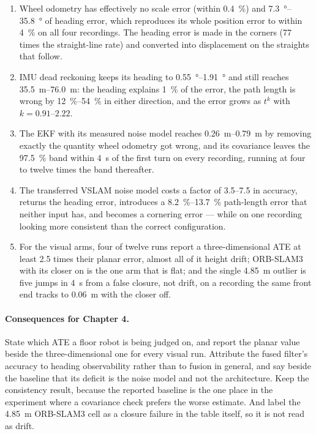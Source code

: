 \documentclass[11pt,a4paper,notitlepage]{report}
\begin{document}
\begin{enumerate}
\item Wheel odometry has effectively no scale error (within
      \SI{0.4}{\percent}) and \SIrange{7.3}{35.8}{\degree} of heading error,
      which reproduces its whole position error to within \SI{4}{\percent} on
      all four recordings. The heading error is made in the corners
      (\num{77} times the straight-line rate) and converted into displacement
      on the straights that follow.
\item IMU dead reckoning keeps its heading to
      \SIrange{0.55}{1.91}{\degree} and still reaches
      \SIrange{35.5}{76.0}{\metre}: the heading explains \SI{1}{\percent} of
      the error, the path length is wrong by \SIrange{12}{54}{\percent} in
      either direction, and the error grows as $t^{k}$ with
      $k = \numrange{0.91}{2.22}$.
\item The EKF with its measured noise model reaches
      \SIrange{0.26}{0.79}{\metre} by removing exactly the quantity wheel
      odometry got wrong, and its covariance leaves the \SI{97.5}{\percent}
      band within \SI{4}{\second} of the first turn on every recording,
      running at four to twelve times the band thereafter.
\item The transferred VSLAM noise model costs a factor of
      \numrange{3.5}{7.5} in accuracy, returns the heading error, introduces a
      \SIrange{8.2}{13.7}{\percent} path-length error that neither input has,
      and becomes a cornering error --- while on one recording looking more
      consistent than the correct configuration.
\item For the visual arms, four of twelve runs report a three-dimensional ATE
      at least \num{2.5} times their planar error, almost all of it height
      drift; ORB-SLAM3 with its closer on is the one arm that is flat; and
      the single \SI{4.85}{\metre} outlier is five jumps in
      \SI{4}{\second} from a false closure, not drift, on a recording the same
      front end tracks to \SI{0.06}{\metre} with the closer off.
\end{enumerate}

\paragraph{Consequences for Chapter 4.} State which ATE a floor robot is
being judged on, and report the planar value beside the three-dimensional one
for every visual run. Attribute the fused filter's accuracy to heading
observability rather than to fusion in general, and say beside the baseline
that its deficit is the noise model and not the architecture. Keep the
consistency result, because the reported baseline is the one place in the
experiment where a covariance check prefers the worse estimate. And label the \SI{4.85}{\metre} ORB-SLAM3 cell as a closure failure
in the table itself, so it is not read as drift.
\end{document}
